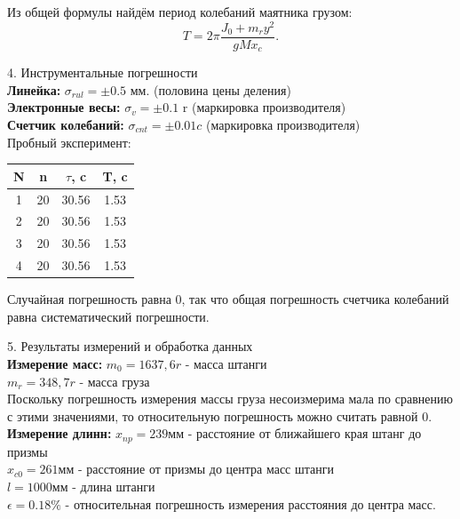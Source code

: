 \documentclass[12pt, a4paper]{article}
\begin{document}
        Из общей формулы найдём период колебаний маятника грузом:
        \begin{equation}
            T = 2\pi{\frac{J_0 + m_ry^2}{gMx_c}}.
        \end{equation}

        {\Large 4. Инструментальные погрешности \\}
        \textbf{Линейка: } $\sigma_{rul} = \pm 0.5$ мм. (половина цены деления)\\
        \textbf{Электронные весы: } $\sigma_{v} = \pm 0.1$ r (маркировка производителя) \\
        \textbf{Счетчик колебаний: } $\sigma_{cnt} = \pm 0.01c$ (маркировка производителя) \\
        \newpage
        Пробный эксперимент:
        \begin{center}
            \begin{tabular}{ | c | c | c | c | }
                \hline
                N & n & $\tau$, c & T, c \\ \hline
                1 & 20 & 30.56 & 1.53 \\ \hline
                2 & 20 & 30.56 & 1.53 \\ \hline
                3 & 20 & 30.56 & 1.53 \\ \hline
                4 & 20 & 30.56 & 1.53 \\ \hline
            \end{tabular}
            \end{center} 
        Случайная погрешность равна 0, так что общая погрешность счетчика колебаний равна систематический погрешности.
            
        \vspace*{0.3cm}
        {\Large 5. Результаты измерений и обработка данных \\} 
        {\textbf{Измерение масс:}}
        $m_0 = 1637,6r$ - масса штанги \\
        $m_r = 348,7r$ - масса груза \\
        Поскольку погрешность измерения массы груза несоизмерима мала по сравнению с этими значениями, то относительную погрешность можно считать равной 0. \\
        {\textbf{Измерение длинн:}}
        $x_{np} = 239$мм - расстояние от ближайшего края штанг до призмы \\
        $x_{c0} = 261$мм - расстояние от призмы до центра масс штанги \\
        $l = 1000$мм - длина штанги \\
        $\epsilon = 0.18\%$ - относительная погрешность измерения расстояния до центра масс.
        
\end{document}
